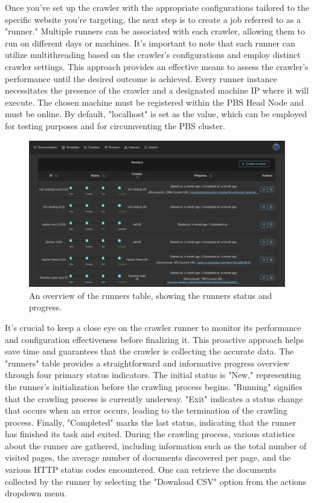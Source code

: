 Once you've set up the crawler with the appropriate configurations tailored to the specific website you're targeting, the next step is to create a job referred to as a "runner." Multiple runners can be associated with each crawler, allowing them to run on different days or machines. It's important to note that each runner can utilize multithreading based on the crawler's configurations and employ distinct crawler settings. This approach provides an effective means to assess the crawler's performance until the desired outcome is achieved. Every runner instance necessitates the presence of the crawler and a designated machine IP where it will execute. The chosen machine must be registered within the PBS Head Node and must be online. By default, "localhost" is set as the value, which can be employed for testing purposes and for circumventing the PBS cluster.

\begin{figure}[h]	
     \centering
     \includegraphics[width=13cm]{figures/demo-8.png}
     \caption{An overview of the runners table, showing the runners status and progress.}
     \label{fig:runners-overview}
\end{figure}


It's crucial to keep a close eye on the crawler runner to monitor its performance and configuration effectiveness before finalizing it. This proactive approach helps save time and guarantees that the crawler is collecting the accurate data. The "runners" table provides a straightforward and informative progress overview through four primary status indicators. The initial status is "New," representing the runner's initialization before the crawling process begins. "Running" signifies that the crawling process is currently underway. "Exit" indicates a status change that occurs when an error occurs, leading to the termination of the crawling process. Finally, "Completed" marks the last status, indicating that the runner has finished its task and exited. During the crawling process, various statistics about the runner are gathered, including information such as the total number of visited pages, the average number of documents discovered per page, and the various HTTP status codes encountered. One can retrieve the documents collected by the runner by selecting the "Download CSV" option from the actions dropdown menu.



